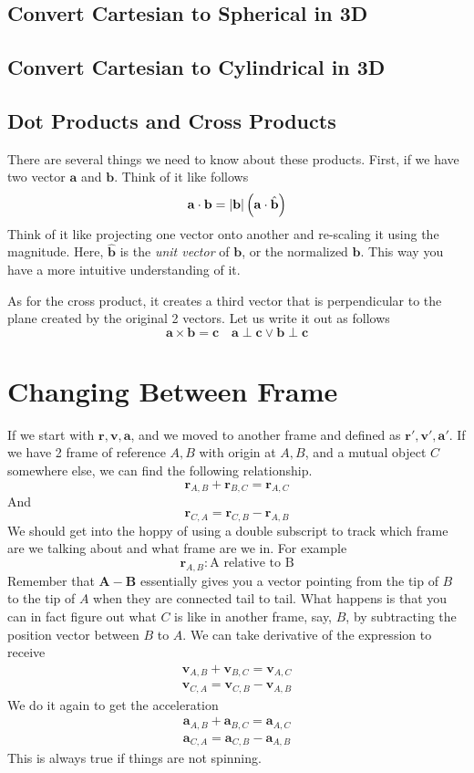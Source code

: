 \documentclass[12pt]{article}
\newcommand{\paren}[1]{\left( #1 \right)}
\newcommand{\abso}[1]{\left|#1 \right|}
\begin{document}
\subsection{Convert Cartesian to Spherical in 3D}

\subsection{Convert Cartesian to Cylindrical in 3D}

\subsection{Dot Products and Cross Products}
There are several things we need to know about these products. First, if we have two vector $\mathbf{a}$ and $\mathbf{b}$. Think of it like follows
\[
\mathbf{a}\cdot\mathbf{b} = \abso{\mathbf{b}}\paren{\mathbf{a}\cdot \Hat{\mathbf{b}}}
\]
Think of it like projecting one vector onto another and re-scaling it using the magnitude. Here, $\hat{\mathbf{b}}$ is the \textit{unit vector} of $\mathbf{b}$, or the normalized $\mathbf{b}$. This way you have a more intuitive understanding of it.

As for the cross product, it creates a third vector that is perpendicular to the plane created by the original 2 vectors. Let us write it out as follows
\[
\mathbf{a}\times \mathbf{b} = \mathbf{c} \quad \mathbf{a}\perp \mathbf{c} \vee \mathbf{b}\perp\mathbf{c}
\]

\section{Changing Between Frame}
If we start with $\mathbf{r},\mathbf{v},\mathbf{a}$, and we moved to another frame and defined as $\mathbf{r}',\mathbf{v}',\mathbf{a}'$. If we have 2 frame of reference $A,B$ with origin at $A,B$, and a mutual object $C$ somewhere else, we can find the following relationship.
\[
\mathbf{r}_{A,B} + \mathbf{r}_{B,C} = \mathbf{r}_{A,C}
\]
And
\[
\mathbf{r}_{C,A} = \mathbf{r}_{C,B} - \mathbf{r}_{A,B}
\]
We should get into the hoppy of using a double subscript to track which frame are we talking about and what frame are we in. For example
\[
\mathbf{r}_{A,B} \colon \text{A relative to B}
\]
Remember that $\mathbf{A} - \mathbf{B}$ essentially gives you a vector pointing from the tip of $B$ to the tip of $A$ when they are connected tail to tail.
What happens is that you can in fact figure out what $C$ is like in another frame, say, $B$, by subtracting the position vector between $B$ to $A$. We can take derivative of the expression to receive
\begin{align*}
    \mathbf{v}_{A,B}+\mathbf{v}_{B,C}=\mathbf{v}_{A,C}\\
    \mathbf{v}_{C,A} = \mathbf{v}_{C,B} - \mathbf{v}_{A,B}
\end{align*}
We do it again to get the acceleration
\begin{align*}
    \mathbf{a}_{A,B}+\mathbf{a}_{B,C}=\mathbf{a}_{A,C}\\
    \mathbf{a}_{C,A} = \mathbf{a}_{C,B} - \mathbf{a}_{A,B}
\end{align*}
This is always true if things are not spinning.
\end{document}
